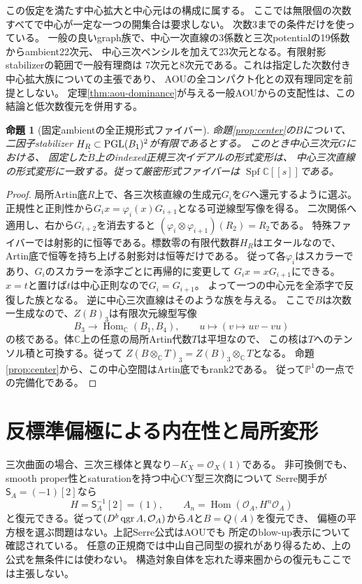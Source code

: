 \documentclass[11pt,a4paper]{ltjsarticle}
\newtheorem{proposition}[theorem]{命題}
\theoremstyle{definition}\newtheorem{remark}[theorem]{注意}
\newcommand{\PP}{\mathbb P}\newcommand{\kk}{\mathbb C}
\newcommand{\Hom}{\operatorname{Hom}}\newcommand{\HH}{\operatorname{HH}}
\newcommand{\OO}{\mathcal O}\newcommand{\rank}{\operatorname{rank}}
\begin{document}
この仮定を満たす中心拡大と中心元は\cite{LBS,EG,Pym}の構成に属する。
ここでは無限個の次数すべてで中心が一定な一つの開集合は要求しない。
次数3までの条件だけを使っている。
一般の良いgraph族で、中心一次直線の3係数と三次potentialの19係数からambient22次元、
中心三次ペンシルを加えて23次元となる。有限射影stabilizerの範囲で一般有理商は
7次元と8次元である。これは指定した次数付き中心拡大族についての主張であり、
AOUの全コンパクト化との双有理同定を前提としない。
定理\ref{thm:aou-dominance}が与える一般AOUからの支配性は、この結論と低次数復元を併用する。

\begin{proposition}[固定ambientの全正規形式ファイバー]\label{prop:normal}
命題\ref{prop:center}の$B$について、二因子stabilizer
$H_R\subset\operatorname{PGL}(B_1)^2$が有限であるとする。
このとき中心三次元$G$における、
固定した$\check B$上のindexed正規三次イデアルの形式変形は、
中心三次直線の形式変形に一致する。従って厳密形式ファイバーは
$\operatorname{Spf}\kk[[s]]$である。
\end{proposition}
\begin{proof}
局所Artin底$R$上で、各三次核直線の生成元$G_i$を$G$へ還元するように選ぶ。
正規性と正則性から$G_i x=\varphi_i(x)G_{i+1}$となる可逆線型写像を得る。
二次関係へ適用し、右から$G_{i+2}$を消去すると
$(\varphi_i\otimes\varphi_{i+1})(R_2)=R_2$である。
特殊ファイバーでは射影的に恒等である。標数零の有限代数群$H_R$はエタールなので、
Artin底で恒等を持ち上げる射影対は恒等だけである。
従って各$\varphi_i$はスカラーであり、$G_i$のスカラーを添字ごとに再帰的に変更して
$G_i x=xG_{i+1}$にできる。$x=t$と置けば$t$は中心正則なので$G_i=G_{i+1}$。
よって一つの中心元を全添字で反復した族となる。
逆に中心三次直線はそのような族を与える。
ここで$B$は次数一生成なので、$Z(B)_3$は有限次元線型写像
\[
 B_3\longrightarrow\Hom_\kk(B_1,B_4),\qquad
 u\longmapsto(v\mapsto uv-vu)
\]
の核である。体$\kk$上の任意の局所Artin代数$T$は平坦なので、
この核は$T$へのテンソル積と可換する。従って
$Z(B\otimes_\kk T)_3=Z(B)_3\otimes_\kk T$となる。
命題\ref{prop:center}から、この中心空間はArtin底でもrank2である。
従って$\PP^1$の一点での完備化である。
\end{proof}

\section{反標準偏極による内在性と局所変形}
三次曲面の場合、三次三様体と異なり$-K_X=\OO_X(1)$である。
非可換側でも、smooth proper性とsaturationを持つ中心CY型三次商について
Serre関手が$\mathsf S_A=(-1)[2]$なら
\[
 H=\mathsf S_A^{-1}[2]=(1),\qquad
 A_n=\Hom(\OO_A,H^n\OO_A)
\]
と復元できる。従って$(D^b\qgr A,\OO_A)$から$A$と$B=Q(A)$を復元でき、
偏極の平方根を選ぶ問題はない。上記Serre公式はAOU\cite[Lemma 9.2]{AOU}でも
所定のblow-up表示について確認されている。
任意の正規商では中山自己同型の捩れがあり得るため、上の公式を無条件には使わない。
構造対象自体を忘れた導来圏からの復元もここでは主張しない。
\end{document}
